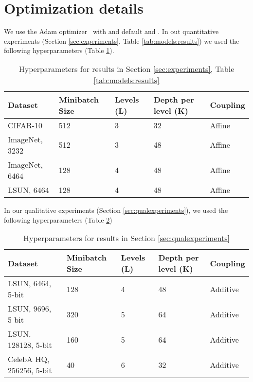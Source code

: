 \documentclass{article}
\begin{document}
\section{Optimization details}\label{sec:opt}

We use the Adam optimizer~\citep{kingma2015adam} with  and default  and . In out quantitative experiments (Section \ref{sec:experiments}, Table \ref{tab:models:results}) we used the following hyperparameters (Table \ref{tab:models:hyper}). \\
\begin{table}[h]
    \centering
    \caption{Hyperparameters for results in Section \ref{sec:experiments}, Table \ref{tab:models:results}}
    \label{tab:models:hyper}
    \begin{tabular}{l | l | l | l | l}
    \toprule
    Dataset & Minibatch Size & Levels (L) & Depth per level (K) & Coupling
    \\\midrule
    CIFAR-10 & 512 & 3 & 32 & Affine
    \\\midrule
    ImageNet, 3232 & 512 & 3 & 48 & Affine
    \\\midrule
    ImageNet, 6464 & 128 & 4 & 48 & Affine
    \\\midrule
    LSUN, 6464 & 128 & 4 & 48 & Affine
    \\\bottomrule
    \end{tabular}
\end{table}

In our qualitative experiments (Section \ref{sec:qualexperiments}), we used the following hyperparameters (Table \ref{tab:models:hyper_qual})
\begin{table}[h]
    \centering
    \caption{Hyperparameters for results in Section \ref{sec:qualexperiments}}
    \label{tab:models:hyper_qual}
    \begin{tabular}{l | l | l | l | l}
    \toprule
    Dataset & Minibatch Size & Levels (L) & Depth per level (K) & Coupling
    \\\midrule
    LSUN, 6464, 5-bit & 128 & 4 & 48 & Additive
    \\\midrule
    LSUN, 9696, 5-bit & 320 & 5 & 64 & Additive
    \\\midrule
    LSUN, 128128, 5-bit & 160 & 5 & 64 & Additive
    \\\midrule
    CelebA HQ, 256256, 5-bit & 40 & 6 & 32 & Additive
    \\\bottomrule
    \end{tabular}
\end{table}
\end{document}

